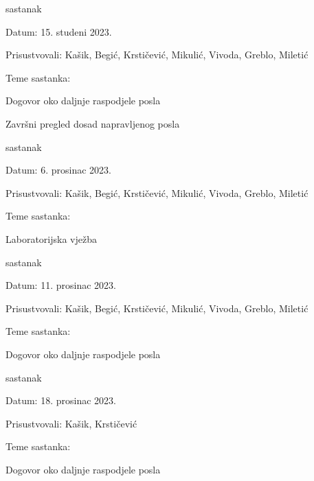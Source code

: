 \begin{packed_enum}
	\item  sastanak
	\item[] \begin{packed_item}
		\item Datum: 15. studeni 2023.
		\item Prisustvovali: Kašik, Begić, Krstičević, Mikulić, Vivoda, Greblo, Miletić
		\item Teme sastanka:
		\begin{packed_item}
			\item  Dogovor oko daljnje raspodjele posla
			\item  Završni pregled dosad napravljenog posla
		\end{packed_item}
	\end{packed_item}
	
	\item  sastanak
	\item[] \begin{packed_item}
		\item Datum: 6. prosinac 2023.
		\item Prisustvovali: Kašik, Begić, Krstičević, Mikulić, Vivoda, Greblo, Miletić
		\item Teme sastanka:
		\begin{packed_item}
			\item  Laboratorijska vježba
		\end{packed_item}
	\end{packed_item}
	
	\item  sastanak
	\item[] \begin{packed_item}
		\item Datum: 11. prosinac 2023.
		\item Prisustvovali: Kašik, Begić, Krstičević, Mikulić, Vivoda, Greblo, Miletić
		\item Teme sastanka:
		\begin{packed_item}
			\item  Dogovor oko daljnje raspodjele posla
		\end{packed_item}
	\end{packed_item}
	
	\item  sastanak
	\item[] \begin{packed_item}
		\item Datum: 18. prosinac 2023.
		\item Prisustvovali: Kašik, Krstičević
		\item Teme sastanka:
		\begin{packed_item}
			\item  Dogovor oko daljnje raspodjele posla
		\end{packed_item}
	\end{packed_item}
	

\end{packed_enum}
